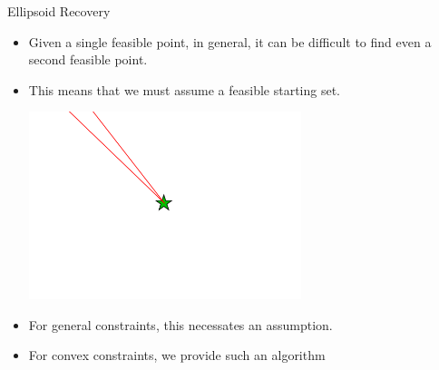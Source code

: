 \documentclass{beamer}
\begin{document}
\begin{frame}{Ellipsoid Recovery}
\begin{itemize}
	\item Given a single feasible point, in general, it can be difficult to find even a second feasible point.
	\item This means that we must assume a feasible starting set.
	\begin{center}
		\includegraphics[width=300px]{images/only_one_feasible_point.png}
	\end{center}
	\item For general constraints, this necessates an assumption.
	\item For convex constraints, we provide such an algorithm
\end{itemize}
\end{frame}
\end{document}
